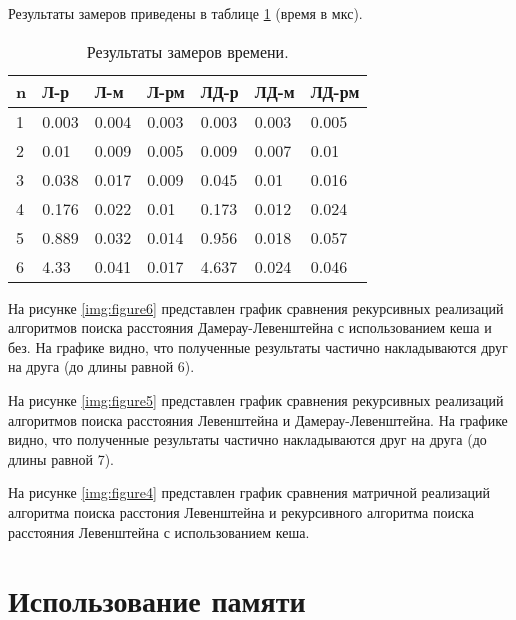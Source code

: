Результаты замеров приведены в таблице \ref{tab:time} (время в мкс).

\begin{table}[!ht]
    \centering
	\caption{\label{tab:time}Результаты замеров времени.}
    \begin{tabular}{|l|l|l|l|l|l|l|}
    \hline
        n & Л-р & Л-м & Л-рм & ЛД-р & ЛД-м & ЛД-рм \\ \hline
		1 & 0.003 & 0.004 & 0.003 & 0.003 & 0.003 & 0.005 \\ \hline
        2 & 0.01 & 0.009 & 0.005 & 0.009 & 0.007 & 0.01 \\ \hline
        3 & 0.038 & 0.017 & 0.009 & 0.045 & 0.01 & 0.016 \\ \hline
        4 & 0.176 & 0.022 & 0.01 & 0.173 & 0.012 & 0.024 \\ \hline
        5 & 0.889 & 0.032 & 0.014 & 0.956 & 0.018 & 0.057 \\ \hline
        6 & 4.33 & 0.041 & 0.017 & 4.637 & 0.024 & 0.046 \\ \hline
    \end{tabular}
\end{table}


На рисунке \ref{img:figure6} представлен график сравнения рекурсивных реализаций алгоритмов поиска расстояния Дамерау-Левенштейна с использованием кеша и без. На графике видно, что полученные результаты частично накладываются друг на друга (до длины равной 6).

На рисунке \ref{img:figure5} представлен график сравнения рекурсивных реализаций алгоритмов поиска расстояния Левенштейна и Дамерау-Левенштейна. На графике видно, что полученные результаты частично накладываются друг на друга (до длины равной 7).

На рисунке \ref{img:figure4} представлен график сравнения матричной реализаций алгоритма поиска расстония Левенштейна и рекурсивного алгоритма поиска расстояния Левенштейна с использованием кеша.


 
\section{Использование памяти}

